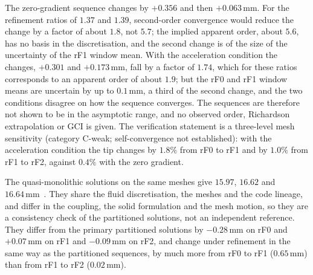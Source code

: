 The zero-gradient sequence changes by $+0.356$ and then $+0.063\,\mathrm{mm}$.
For the refinement ratios of $1.37$ and $1.39$, second-order convergence would reduce the change by a factor of about $1.8$, not $5.7$; the implied apparent order, about $5.6$, has no basis in the discretisation, and the second change is of the size of the uncertainty of the rF1 window mean.
With the acceleration condition the changes, $+0.301$ and $+0.173\,\mathrm{mm}$, fall by a factor of $1.74$, which for these ratios corresponds to an apparent order of about $1.9$; but the rF0 and rF1 window means are uncertain by up to $0.1\,\mathrm{mm}$, a third of the second change, and the two conditions disagree on how the sequence converges.
The sequences are therefore not shown to be in the asymptotic range, and no observed order, Richardson extrapolation or GCI is given.
The verification statement is a three-level mesh sensitivity (category C-weak; self-convergence not established): with the acceleration condition the tip changes by $1.8\%$ from rF0 to rF1 and by $1.0\%$ from rF1 to rF2, against $0.4\%$ with the zero gradient.

The quasi-monolithic solutions on the same meshes give $15.97$, $16.62$ and $16.64\,\mathrm{mm}$~\citep{CardiffBatistic2026QM}.
They share the fluid discretisation, the meshes and the code lineage, and differ in the coupling, the solid formulation and the mesh motion, so they are a consistency check of the partitioned solutions, not an independent reference.
They differ from the primary partitioned solutions by $-0.28\,\mathrm{mm}$ on rF0 and $+0.07\,\mathrm{mm}$ on rF1 and $-0.09\,\mathrm{mm}$ on rF2, and change under refinement in the same way as the partitioned sequences, by much more from rF0 to rF1 ($0.65\,\mathrm{mm}$) than from rF1 to rF2 ($0.02\,\mathrm{mm}$).

